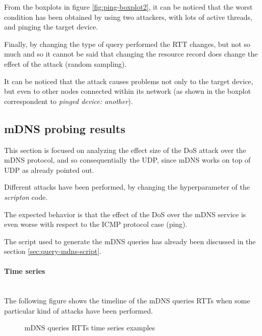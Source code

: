 \documentclass[fleqn, 11pt]{SelfArx} %
\begin{document}
From the boxplots in figure \ref{fig:ping-boxplot2}, it can be noticed that the worst condition has been obtained by using two attackers, with lots of active threads, and pinging the target device.

Finally, by changing the type of query performed the RTT changes, but not so much and so it cannot be said that changing the resource record does change the effect of the attack (random sampling).

It can be noticed that the attack causes problems not only to the target device, but even to other nodes connected within its network  (as shown in the boxplot correspondent to {\it{pinged device: another}}).
\subsection{mDNS probing results}
This section is focused on analyzing the effect size of the DoS attack over the mDNS protocol, and so consequentially the UDP, since mDNS works on top of UDP as already pointed out.

Different attacks have been performed, by changing the hyperparameter of the {\it{scripton}} code.

The expected behavior is that the effect of the DoS over the mDNS service is even worse with respect to the ICMP protocol case (ping).

The script used to generate the mDNS queries has already been discussed in the section \ref{sec:query-mdns-script}.
\paragraph{Time series}\mbox{}\\
The following figure shows the timeline of the mDNS queries RTTs when some particular kind of attacks have been performed.

\begin{figure}[H]
    \centering
    \qquad
    \caption{mDNS queries RTTs time series examples}%
    \label{fig:mdns-rtts-time-series}%
\end{figure}
\end{document}
